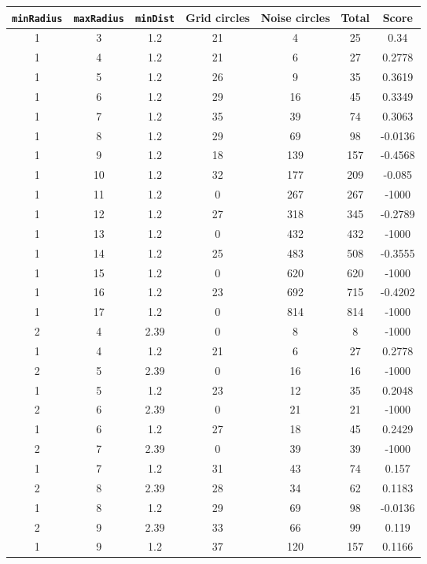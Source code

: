 \documentclass[letterpaper, 12pt]{article}
\begin{document}
\begin{longtable}{|c|c|c|c|c|c|c|}
\hline
\textbf{\texttt{minRadius}} & \textbf{\texttt{maxRadius}} & \textbf{\texttt{minDist}} & \textbf{Grid circles} & \textbf{Noise circles} & \textbf{Total} & \textbf{Score} \\
\hline
1 & 3 & 1.2 & 21 & 4 & 25 & 0.34 \\
\hline
1 & 4 & 1.2 & 21 & 6 & 27 & 0.2778 \\
\hline
1 & 5 & 1.2 & 26 & 9 & 35 & 0.3619 \\
\hline
1 & 6 & 1.2 & 29 & 16 & 45 & 0.3349 \\
\hline
1 & 7 & 1.2 & 35 & 39 & 74 & 0.3063 \\
\hline
1 & 8 & 1.2 & 29 & 69 & 98 & -0.0136 \\
\hline
1 & 9 & 1.2 & 18 & 139 & 157 & -0.4568 \\
\hline
1 & 10 & 1.2 & 32 & 177 & 209 & -0.085 \\
\hline
1 & 11 & 1.2 & 0 & 267 & 267 & -1000 \\
\hline
1 & 12 & 1.2 & 27 & 318 & 345 & -0.2789 \\
\hline
1 & 13 & 1.2 & 0 & 432 & 432 & -1000 \\
\hline
1 & 14 & 1.2 & 25 & 483 & 508 & -0.3555 \\
\hline
1 & 15 & 1.2 & 0 & 620 & 620 & -1000 \\
\hline
1 & 16 & 1.2 & 23 & 692 & 715 & -0.4202 \\
\hline
1 & 17 & 1.2 & 0 & 814 & 814 & -1000 \\
\hline
2 & 4 & 2.39 & 0 & 8 & 8 & -1000 \\
\hline
1 & 4 & 1.2 & 21 & 6 & 27 & 0.2778 \\
\hline
2 & 5 & 2.39 & 0 & 16 & 16 & -1000 \\
\hline
1 & 5 & 1.2 & 23 & 12 & 35 & 0.2048 \\
\hline
2 & 6 & 2.39 & 0 & 21 & 21 & -1000 \\
\hline
1 & 6 & 1.2 & 27 & 18 & 45 & 0.2429 \\
\hline
2 & 7 & 2.39 & 0 & 39 & 39 & -1000 \\
\hline
1 & 7 & 1.2 & 31 & 43 & 74 & 0.157 \\
\hline
2 & 8 & 2.39 & 28 & 34 & 62 & 0.1183 \\
\hline
1 & 8 & 1.2 & 29 & 69 & 98 & -0.0136 \\
\hline
2 & 9 & 2.39 & 33 & 66 & 99 & 0.119 \\
\hline
1 & 9 & 1.2 & 37 & 120 & 157 & 0.1166 \\

\end{longtable}
\end{document}
